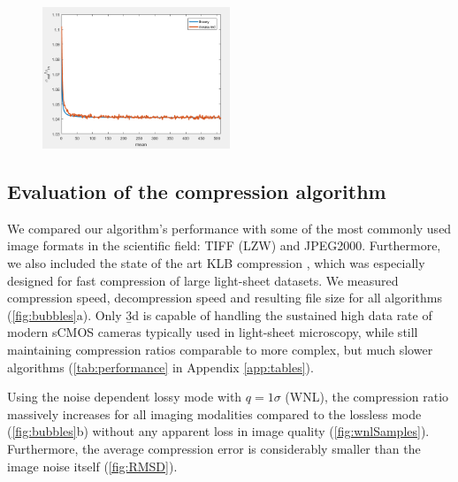     \begin{figure}
      \centering
      \includegraphics[width=0.5\textwidth]{extraNoise}
      \label{fig:extraNoise}
    \end{figure}

  \subsection{Evaluation of the compression algorithm}
    \label{sec:evalB3D}
  We compared our algorithm’s performance with some of the most commonly used image formats in the scientific field: TIFF (LZW) and JPEG2000. Furthermore, we also included the state of the art KLB compression \cite{amat_efficient_2015}, which was especially designed for fast compression of large light-sheet datasets. We measured compression speed, decompression speed and resulting file size for all algorithms (\autoref{fig:bubbles}a). Only \b3d is capable of handling the sustained high data rate of modern sCMOS cameras typically used in light-sheet microscopy, while still maintaining compression ratios comparable to more complex, but much slower algorithms (\autoref{tab:performance} in Appendix \ref{app:tables}).

  Using the noise dependent lossy mode with $q=1\sigma$ (WNL), the compression ratio massively increases for all imaging modalities compared to the lossless mode (\autoref{fig:bubbles}b) without any apparent loss in image quality (\autoref{fig:wnlSamples}). Furthermore, the average compression error is considerably smaller than the image noise itself (\autoref{fig:RMSD}).

